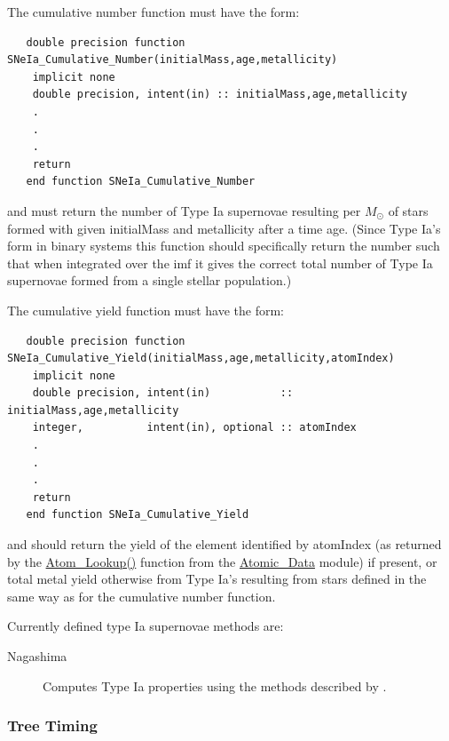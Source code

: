 The cumulative number function must have the form:
\begin{verbatim}
   double precision function SNeIa_Cumulative_Number(initialMass,age,metallicity)
    implicit none
    double precision, intent(in) :: initialMass,age,metallicity
    .
    .
    .
    return
   end function SNeIa_Cumulative_Number 
\end{verbatim}
and must return the number of Type Ia supernovae resulting per $M_\odot$ of stars formed with given {\normalfont \ttfamily initialMass} and {\normalfont \ttfamily metallicity} after a time {\normalfont \ttfamily age}. (Since Type Ia's form in binary systems this function should specifically return the number such that when integrated over the \gls{imf} it gives the correct total number of Type Ia supernovae formed from a single stellar population.)

The cumulative yield function must have the form:
\begin{verbatim}
   double precision function SNeIa_Cumulative_Yield(initialMass,age,metallicity,atomIndex)
    implicit none
    double precision, intent(in)           :: initialMass,age,metallicity
    integer,          intent(in), optional :: atomIndex
    .
    .
    .
    return
   end function SNeIa_Cumulative_Yield 
\end{verbatim}
and should return the yield of the element identified by {\normalfont \ttfamily atomIndex} (as returned by the \hyperlink{atomic.data.F90:atomic_data:atom_lookup}{{\normalfont \ttfamily Atom\_Lookup()}} function from the \hyperlink{atomic.data.F90:atomic_data}{{\normalfont \ttfamily Atomic\_Data}} module) if present, or total metal yield otherwise from Type Ia's resulting from stars defined in the same way as for the cumulative number function.

Currently defined type Ia supernovae methods are:
\begin{description}
 \item [{\normalfont \ttfamily Nagashima}] Computes Type Ia properties using the methods described by \cite{nagashima_metal_2005}.
\end{description}

\subsubsection{Tree Timing}

